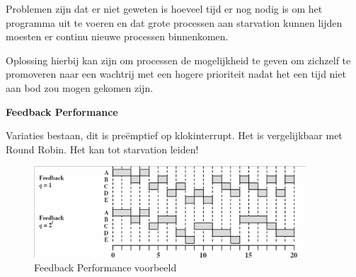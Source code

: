 Problemen zijn dat er niet geweten is hoeveel tijd er nog nodig is om het programma uit te voeren en dat grote processen aan starvation kunnen lijden moesten er continu nieuwe processen binnenkomen.

Oplossing hierbij kan zijn om processen de mogelijkheid te geven om zichzelf te promoveren naar een wachtrij met een hogere prioriteit nadat het een tijd niet aan bod zou mogen gekomen zijn.




\textbf{Feedback Performance}

Variaties bestaan, dit is preëmptief op klokinterrupt. Het is vergelijkbaar met Round Robin. Het kan tot starvation leiden!

\begin{figure}[htp]
    \centering
            \includegraphics[width=4in]{img/feedbackperformance.png}
        \caption{Feedback Performance voorbeeld}
    \label{fig:Feedback Performance voorbeeld}
\end{figure}












